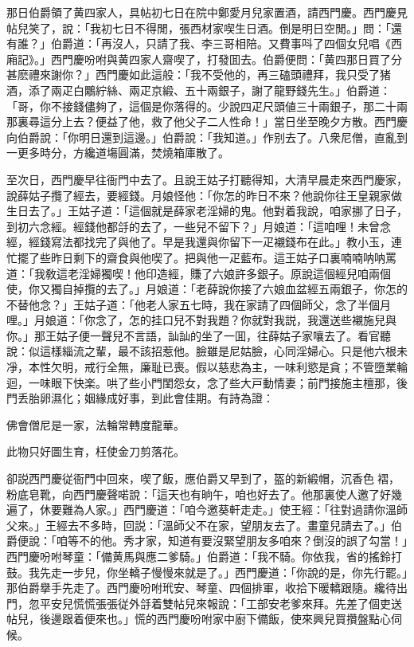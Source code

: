 那日伯爵領了黄四家人，具帖初七日在院中鄭愛月兒家置酒，請西門慶。西門慶見帖兒笑了，說：「我初七日不得閒，張西材家喫生日酒。倒是明日空閒。」問：「還有誰？」伯爵道：「再沒人，只請了我、李三哥相陪。又費事呌了四個女兒唱《西廂記》。」西門慶吩咐與黄四家人齋喫了，打發囬去。伯爵便問：「黄四那日買了分甚麽禮來謝你？」西門慶如此這般：「我不受他的，再三磕頭禮拜，我只受了猪酒，添了兩疋白鷴紵絲、兩疋京緞、五十兩銀子，謝了龍野錢先生。」伯爵道：「哥，你不接錢儘夠了，這個是你落得的。少說四疋尺頭値三十兩銀子，那二十兩那裏尋這分上去？便益了他，救了他父子二人性命！」當日坐至晚夕方散。西門慶向伯爵說：「你明日還到這邊。」伯爵說：「我知道。」作别去了。八衆尼僧，直亂到一更多時分，方纔道塲圓滿，焚燒箱庫散了。

至次日，西門慶早往衙門中去了。且說王姑子打聽得知，大清早晨走來西門慶家，說薛姑子攬了經去，要經錢。月娘怪他：「你怎的昨日不來？他說你往王皇親家做生日去了。」王姑子道：「這個就是薛家老淫婦的鬼。他對着我說，咱家挪了日子，到初六念經。經錢他都㧱的去了，一些兒不留下？」月娘道：「這咱哩！未曾念經，經錢寫法都找完了與他了。早是我還與你留下一疋襯錢布在此。」教小玉，連忙擺了些昨日剩下的齋食與他喫了。把與他一疋藍布。這王姑子口裏喃喃呐呐罵道：「我敎這老淫婦獨喫！他印造經，賺了六娘許多銀子。原說這個經兒咱兩個使，你又獨自掉攬的去了。」月娘道：「老薛說你接了六娘血盆經五兩銀子，你怎的不替他念？」王姑子道：「他老人家五七時，我在家請了四個師父，念了半個月哩。」月娘道：「你念了，怎的挂口兒不對我題？你就對我説，我還送些襯施兒與你。」那王姑子便一聲兒不言語，訕訕的坐了一囬，往薛姑子家嚷去了。看官聽說：似這樣緇流之輩，最不該招惹他。臉雖是尼姑臉，心同淫婦心。只是他六根未凈，本性欠明，戒行全無，廉耻已喪。假以慈悲為主，一味利慾是貪；不管墮業輪迴，一味眼下快楽。哄了些小門閨怨女，念了些大戸動情妻；前門接施主檀那，後門丢胎卵濕化；姻緣成好事，到此會佳期。有詩為證：

\begin{myquote}
佛會僧尼是一家，法輪常轉度龍華。

此物只好圖生育，枉使金刀剪落花。
\end{myquote}

卻説西門慶従衙門中回來，喫了飯，應伯爵又早到了，盔的新緞帽，沉香色𧜽褶，粉底皂靴，向西門慶聲喏說：「這天也有晌午，咱也好去了。他那裏使人邀了好幾遍了，休要難為人家。」西門慶道：「咱今邀葵軒走走。」使王經：「往對過請你溫師父來。」王經去不多時，回説：「溫師父不在家，望朋友去了。畫童兒請去了。」伯爵便說：「咱等不的他。秀才家，知道有要沒緊望朋友多咱來？倒沒的誤了勾當！」西門慶吩咐琴童：「備黄馬與應二爹騎。」伯爵道：「我不騎。你依我，省的搖鈴打鼓。我先走一步兒，你坐轎子慢慢來就是了。」西門慶道：「你說的是，你先行罷。」那伯爵擧手先走了。西門慶吩咐玳安、琴童、四個排軍，收拾下暖轎跟隨。纔待出門，忽平安兒慌慌張張従外㧱着雙帖兒來報說：「工部安老爹來拜。先差了個吏送帖兒，後邊跟着便來也。」慌的西門慶吩咐家中廚下備飯，使來興兒買攢盤點心伺候。

